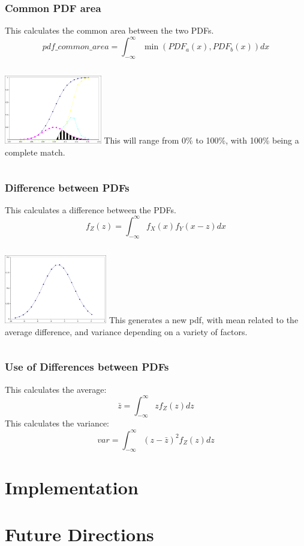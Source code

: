 \documentclass{beamer}
\begin{document}
\begin{frame}
  \frametitle{Common PDF area}
  This calculates the common area between the two PDFs.
  \begin{equation}
    pdf\_common\_area = \int_{-\infty}^{\infty}{\min(PDF_a(x),PDF_b(x))}dx
  \end{equation}
  \begin{columns}
    \includegraphics[height=3cm]{example_pdf_common}
    This will range from 0\% to 100\%, with 100\% being a complete match.
  \end{columns}
\end{frame}


\begin{frame}
  \frametitle{Difference between PDFs}
  This calculates a difference between the PDFs.
  \begin{equation}
    f_Z(z) = \int_{-\infty}^{\infty}f_X(x)f_Y(x-z)dx
  \end{equation}
  \begin{columns}
    \includegraphics[height=3cm]{f_z}
    This generates a new pdf, with mean related
    to the average difference, and variance depending on a variety of
    factors.
  \end{columns}
\end{frame}

\begin{frame}
  \frametitle{Use of Differences between PDFs}
  This calculates the average:
  \begin{equation}
    \bar{z} = \int_{-\infty}^{\infty}{z f_Z(z)dz}
  \end{equation}
  This calculates the variance:
  \begin{equation}
    var = \int_{-\infty}^{\infty}{(z-\bar{z})^2 f_Z(z)dz}
  \end{equation}
\end{frame}

\section{Implementation}




\section{Future Directions}
\end{document}

